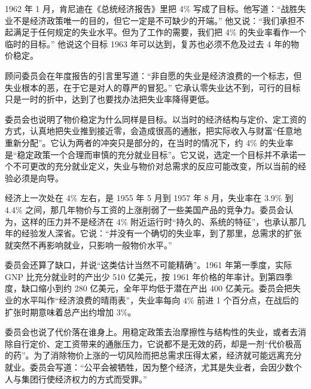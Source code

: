 1962 年 1 月，肯尼迪在《总统经济报告》里把 4\% 写成了目标\cite{erp1962}。他写道：“战胜失业不是经济政策唯一的目的，但它一定是不可缺少的开端。”\cite{erp1962} 他又说：“我们承担不起满足于任何规定的失业水平。但为了工作的需要，我们把 4\% 的失业率看作一个临时的目标。”\cite{erp1962} 他说这个目标 1963 年可以达到，复苏也必须不危及过去 4 年的物价稳定\cite{erp1962}。

顾问委员会在年度报告的引言里写道：“非自愿的失业是经济浪费的一个标志，但失业根本的恶，在于它是对人的尊严的冒犯。”\cite{erp1962} 它承认零失业达不到，可行的目标只是一时的折中，达到了也要找办法把失业率降得更低\cite{erp1962}。

委员会也说明了物价稳定为什么同样是目标。以当时的经济结构与定价、定工资的方式，认真地把失业推到接近零，会造成很高的通胀，把实际收入与财富“任意地重新分配”\cite{erp1962}。它认为两者的冲突只是部分的，在当时的情况下，约 4\% 的失业率是“稳定政策一个合理而审慎的充分就业目标”\cite{erp1962}。它又说，选定一个目标并不承诺一个不可更改的充分就业定义，失业与物价对总需求的反应可能改变，所以当前的经验必须是向导\cite{erp1962}。

经济上一次处在 4\% 左右，是 1955 年 5 月到 1957 年 8 月，失业率在 3.9\% 到 4.4\% 之间，那几年物价与工资的上涨削弱了一些美国产品的竞争力\cite{erp1962}。委员会认为，这样的压力并不是经济在 4\% 附近运行时“持久的、系统的特征”，也承认那几年的经验发人深省\cite{erp1962}。它说：“并没有一个确切的失业率，到了那里，总需求的扩张就突然不再影响就业，只影响一般物价水平。”\cite{erp1962}

委员会还算了缺口，并说“这类估计当然不可能精确”\cite{erp1962}。1961 年第一季度，实际 GNP 比充分就业时的产出少 510 亿美元，按 1961 年价格的年率计\cite{erp1962}。到第四季度，缺口缩小到约 280 亿美元，全年平均低于潜在产出 400 亿美元\cite{erp1962}。委员会把失业的水平叫作“经济浪费的晴雨表”，失业率每向 4\% 前进 1 个百分点，在战后的扩张时期意味着总产出约增加 3\%\cite{erp1962}。

委员会也说了代价落在谁身上。用稳定政策去治摩擦性与结构性的失业，或者去消除自行定价、定工资带来的通胀压力，它说都不是无效的药，却是一剂“代价极高的药”\cite{erp1962}。为了消除物价上涨的一切风险而把总需求压得太紧，经济就可能远离充分就业\cite{erp1962}。委员会写道：“公平会被牺牲，因为整个经济，尤其是失业者，会因少数个人与集团行使经济权力的方式而受罪。”\cite{erp1962}

